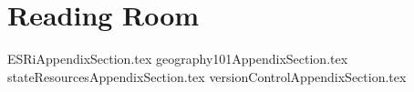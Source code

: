 
\chapter{Reading Room}
{ESRiAppendixSection.tex}
\clearpage
{geography101AppendixSection.tex}
\clearpage
{stateResourcesAppendixSection.tex}
\clearpage
{versionControlAppendixSection.tex}

